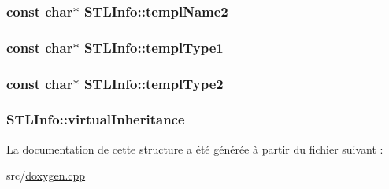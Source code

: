 \subsubsection[{templ\+Name2}]{\setlength{\rightskip}{0pt plus 5cm}const char$\ast$ S\+T\+L\+Info\+::templ\+Name2}\label{struct_s_t_l_info_a17fe8a04bb515e521c2f1f9eea74b311}
\hypertarget{struct_s_t_l_info_a8f988e4df5b95c1083c0c45f2abac17e}{}
\subsubsection[{templ\+Type1}]{\setlength{\rightskip}{0pt plus 5cm}const char$\ast$ S\+T\+L\+Info\+::templ\+Type1}\label{struct_s_t_l_info_a8f988e4df5b95c1083c0c45f2abac17e}
\hypertarget{struct_s_t_l_info_a17ead4cbe08b8b7c09f32488b392b917}{}
\subsubsection[{templ\+Type2}]{\setlength{\rightskip}{0pt plus 5cm}const char$\ast$ S\+T\+L\+Info\+::templ\+Type2}\label{struct_s_t_l_info_a17ead4cbe08b8b7c09f32488b392b917}
\hypertarget{struct_s_t_l_info_adf7de0dd37358cb2f21c913adab4e2bc}{}
\subsubsection[{virtual\+Inheritance}]{ S\+T\+L\+Info\+::virtual\+Inheritance}\label{struct_s_t_l_info_adf7de0dd37358cb2f21c913adab4e2bc}


La documentation de cette structure a été générée à partir du fichier suivant \+:\begin{DoxyCompactItemize}
\item 
src/\hyperlink{doxygen_8cpp}{doxygen.\+cpp}\end{DoxyCompactItemize}
